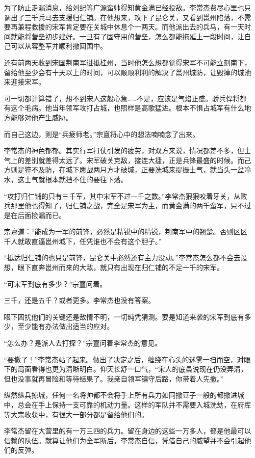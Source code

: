为了防止走漏消息，给刘纪等广源蛮帅得知黄金满已经投敌。李常杰费尽心里也只调出了三千兵马去支援归仁铺。在他想来，攻下了昆仑关，又看到邕州陷落，不需要再兼程救援的宋军肯定要在关城中休息个一两天。而他派出去的兵马，有一天时间就能将营垒初步建好。一旦有了固守用的营垒，怎么都能拖延上一段时间，让自己可以从容整军并顺利撤回国中。

还有前两天收到宋国荆南军进抵桂州，当时他怎么想都觉得宋军不可能立刻南下，留给他至少会有十天以上的时间，可以顺顺利利的解决了邕州城防，让毁掉的城池来迎接宋军。

可一切都计算错了，想不到宋人这般心急……不是，应该是气焰正盛。骄兵悍将都有这个毛病。他当年领军攻打占城，也照样是高歌猛进。根本不惧占城军有什么地方能够对他产生威胁。

而自己这边，则是“兵疲师老。”宗亶将心中的想法喃喃念了出来。

李常杰的神色郁郁。其实行军打仗引发的疲劳，对双方来说，情况都差不多，但士气上的差别就差得太远了。宋军破关克敌，接连大捷，正是兵锋最盛的时候。而己方则是猝不及防，在城下鏖战两月方才破城，正要洗城来提振士气，就当头一盆冷水，这士气就根本就挡不住的要往下落。

“攻打归仁铺的只有三千军，其中宋军不过一千之数。”李常杰狠狠咬着牙关，从败兵那里他也得知了，归仁铺之战，完全是宋军为主，而黄金满的两千蛮军，只不过是在后面捡漏而已。

宗亶道：“能成为一军的前锋，必然是精锐中的精锐，荆南军中的翘楚。否则区区千人就敢直逼邕州城下，任凭谁也不会有这个胆子。”

“抵达归仁铺的也只是前锋，昆仑关中必然还有主力没动。”李常杰怎么都不会去设想，眼下直奔邕州而来的大敌，就只有出现在归仁铺的不足一千的宋军。

“可宋军到底有多少？”宗亶问着。

三千，还是五千？或者更多。李常杰也没有答案。

眼下困扰他们的关键还是敌情不明，一切纯凭猜测。要是知道来袭的宋军到底有多少，至少能有办法做出适当的应对。

“怎么办？是派人去打探？”宗亶问着李常杰的意见。

“要撤了！”李常杰站了起来。做出了决定之后，缠绕在心头的迷雾一扫而空，对眼下的局面看得也更为清晰明白。仰天长舒一口气，“宋人的底虽说现在仍没弄清，但也没事就再冒险和等待结果了。我亲自领军镇守后路，你带着人先撤。”

纵然纵兵掠城，任何一名将帅都不会将手上所有兵力如同撒豆子一般的都撒进城中，总会在手上保持一支可靠的机动力量。这样的军队并不需要入城洗劫，在府库等大宗收获中，有很大一部分都是留给他们的。

李常杰留在大营里的有一万三四的兵力。留在身边的这些一万多人，都是他最可以信赖的队伍。就算让他们为全军断后，李常杰自信，凭借自己的威望并不会引起他们的反弹。

